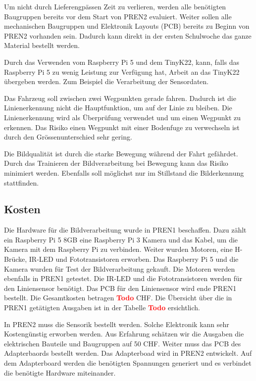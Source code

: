 \documentclass[../main.tex]{subfiles}
\begin{document}
Um nicht durch Lieferengpässen Zeit zu verlieren, werden alle benötigten Baugruppen bereits vor dem Start von PREN2 evaluiert. Weiter sollen alle mechanischen Baugruppen und Elektronik Layouts (PCB) bereits zu Beginn von PREN2 vorhanden sein. Dadurch kann direkt in der ersten Schulwoche das ganze Material bestellt werden.

Durch das Verwenden vom Raspberry Pi 5 und dem TinyK22, kann, falls das Raspberry Pi 5 zu wenig Leistung zur Verfügung hat, Arbeit an das TinyK22 übergeben werden. Zum Beispiel die Verarbeitung der Sensordaten. 

Das Fahrzeug soll zwischen zwei Wegpunkten gerade fahren. Dadurch ist die Linienerkennung nicht die Hauptfunktion, um auf der Linie zu bleiben. Die Linienerkennung wird als Überprüfung verwendet und um einen Wegpunkt zu erkennen. Das Risiko einen Wegpunkt mit einer Bodenfuge zu verwechseln ist durch den Grössenunterschied sehr gering. 

Die Bildqualität ist durch die starke Bewegung während der Fahrt gefährdet. Durch das Trainieren der Bildverarbeitung bei Bewegung kann das Risiko minimiert werden. Ebenfalls soll möglichst nur im Stillstand die Bilderkennung stattfinden. 

\subsection{Kosten}
Die Hardware für die Bildverarbeitung wurde in PREN1 beschaffen. Dazu zählt ein Raspberry Pi 5 8GB eine Raspberry Pi 3 Kamera und das Kabel, um die Kamera mit dem Raspberry Pi zu verbinden. Weiter wurden Motoren, eine H-Brücke, IR-LED und Fototransistoren erworben. Das Raspberry Pi 5 und die Kamera wurden für Test der Bildverarbeitung gekauft. Die Motoren werden ebenfalls in PREN1 getestet. Die IR-LED und die Fototransistoren werden für den Liniensensor benötigt. Das PCB für den Liniensensor wird ende PREN1 bestellt. Die Gesamtkosten betragen  \textcolor{red}{\textbf{Todo}} CHF. Die Übersicht über die in PREN1 getätigten Ausgaben ist in der Tabelle \textcolor{red}{\textbf{Todo}} ersichtlich. 

In PREN2 muss die Sensorik bestellt werden. Solche Elektronik kann sehr Kostengünstig erworben werden. Aus Erfahrung schätzen wir die Ausgaben die elektrischen Bauteile und Baugruppen auf 50 CHF. Weiter muss das PCB des Adapterbaords bestellt werden. Das Adapterboad wird in PREN2 entwickelt. Auf dem Adapterboard werden die benötigten Spannungen generiert und es verbindet die benötigte Hardware miteinander. 
\end{document}
